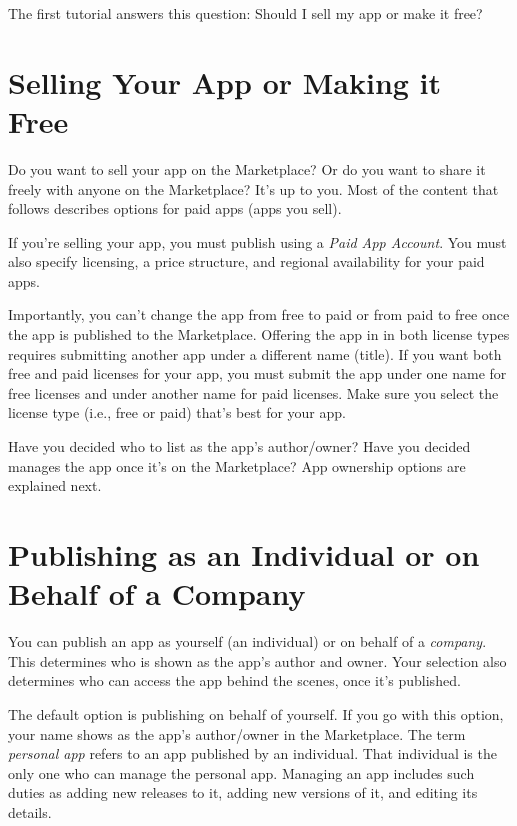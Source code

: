The first tutorial answers this question: Should I sell my app or make
it free?

\section{Selling Your App or Making it
Free}\label{selling-your-app-or-making-it-free}

Do you want to sell your app on the Marketplace? Or do you want to share
it freely with anyone on the Marketplace? It's up to you. Most of the
content that follows describes options for paid apps (apps you sell).

If you're selling your app, you must publish using a \emph{Paid App
Account}. You must also specify licensing, a price structure, and
regional availability for your paid apps.

Importantly, you can't change the app from free to paid or from paid to
free once the app is published to the Marketplace. Offering the app in
in both license types requires submitting another app under a different
name (title). If you want both free and paid licenses for your app, you
must submit the app under one name for free licenses and under another
name for paid licenses. Make sure you select the license type (i.e.,
free or paid) that's best for your app.

Have you decided who to list as the app's author/owner? Have you decided
manages the app once it's on the Marketplace? App ownership options are
explained next.

\section{Publishing as an Individual or on Behalf of a
Company}\label{publishing-as-an-individual-or-on-behalf-of-a-company}

You can publish an app as yourself (an individual) or on behalf of a
\emph{company}. This determines who is shown as the app's author and
owner. Your selection also determines who can access the app behind the
scenes, once it's published.

The default option is publishing on behalf of yourself. If you go with
this option, your name shows as the app's author/owner in the
Marketplace. The term \emph{personal app} refers to an app published by
an individual. That individual is the only one who can manage the
personal app. Managing an app includes such duties as adding new
releases to it, adding new versions of it, and editing its details.

